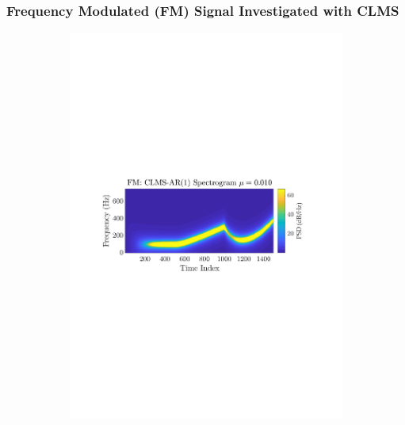 \documentclass[12pt]{article}
\begin{document}
		\subsubsection{Frequency Modulated (FM) Signal Investigated with CLMS}
			\begin{figure}[H]
				\centering
				\begin{subfigure}{0.49\textwidth}
					\centering
					\includegraphics[trim={2.2cm 11.2cm 3.00cm  11.2cm}, clip, width=\textwidth]{../MATLAB/figures/q3_2b_fig02.pdf} 
					\captionsetup{justification=centering}
				\end{subfigure}
				\begin{subfigure}{0.49\textwidth}
					\centering

\end{subfigure}
\end{figure}
\end{document}
